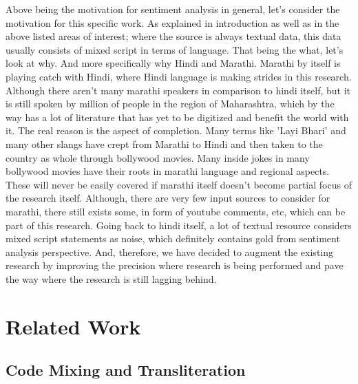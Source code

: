 \documentclass[conference]{IEEEtran}
\begin{document}
 Above being the motivation for sentiment analysis in general, let's consider the motivation for this specific work. As explained in introduction as well as in the above listed areas of interest; where the source is always textual data, this data usually consists of mixed script in terms of language. That being the what, let's look at why. And more specifically why Hindi and Marathi. Marathi by itself is playing catch with Hindi, where Hindi language is making strides in this research. Although there aren't many marathi speakers in comparison to hindi itself, but it is still spoken by million of people in the region of Maharashtra, which by the way has a lot of literature that has yet to be digitized and benefit the world with it. The real reason is the aspect of completion. Many terms like 'Layi Bhari' and many other slangs have crept from Marathi to Hindi and then taken to the country as whole through bollywood movies. Many inside jokes in many bollywood movies have their roots in marathi language and regional aspects. These will never be easily covered if marathi itself doesn't become partial focus of the research itself. Although, there are very few input sources to consider for marathi, there still exists some, in form of youtube comments, etc, which can be part of this research. Going back to hindi itself, a lot of textual resource considers mixed script statements as noise, which definitely contains gold from sentiment analysis perspective. And, therefore, we have decided to augment the existing research by improving the precision where research is being performed and pave the way where the research is still lagging behind.

\section{Related Work}

\subsection{Code Mixing and Transliteration}
\end{document}
